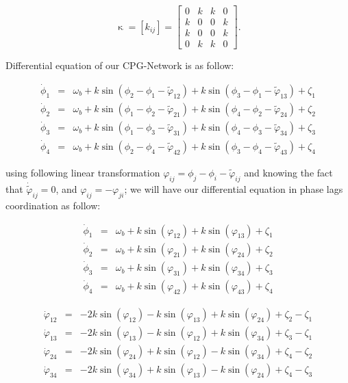 \documentclass{article}
\begin{document}
 	\[ \upkappa = [k_{ij}]=\left[ \begin{array}{rrrr}
	0 & k & k & 0  \\
	k & 0 & 0 & k  \\
	k & 0 & 0 & k  \\
	0 & k & k & 0 
	\end{array} \right].\]

Differential equation of our CPG-Network is as follow:

\begin{eqnarray}\label{eq:cpg_net}
	\dot\phi_1&=&\omega_{b} + k\sin \left(\phi_2-\phi_1-\tilde{\varphi}_{12}\right)+k\sin\left(\phi_3-\phi_1-\tilde{\varphi}_{13}\right)+ \zeta_1\\
 	\dot\phi_2&=&\omega_{b} + k\sin \left(\phi_1-\phi_2-\tilde{\varphi}_{21}\right)+k\sin\left(\phi_4-\phi_2-\tilde{\varphi}_{24}\right)+ \zeta_2\\
 	\dot\phi_3&=&\omega_{b} + k\sin \left(\phi_1-\phi_3-\tilde{\varphi}_{31}\right)+k\sin\left(\phi_4-\phi_3-\tilde{\varphi}_{34}\right)+ \zeta_3\\
	\dot\phi_4&=&\omega_{b} + k\sin \left(\phi_2-\phi_4-\tilde{\varphi}_{42}\right)+k\sin\left(\phi_3-\phi_4-\tilde{\varphi}_{43}\right)+ \zeta_4
\end{eqnarray}

using following linear transformation $\varphi_{ij} = \phi_j - \phi_i - \tilde{\varphi}_{ij} $ and knowing the fact that $\dot{\tilde{\varphi}}_{ij} = 0$, and $\varphi_{ij} = - \varphi_{ji}$;  we will have our differential equation in phase lags coordination as follow:

\begin{eqnarray}\label{eq:cpg_net2}
	\dot\phi_1&=&\omega_{b} + k\sin \left(\varphi_{12}\right)+k\sin\left(\varphi_{13}\right)+ \zeta_1\\
 	\dot\phi_2&=&\omega_{b} + k\sin \left(\varphi_{21}\right)+k\sin\left(\varphi_{24}\right)+ \zeta_2\\
 	\dot\phi_3&=&\omega_{b} + k\sin \left(\varphi_{31}\right)+k\sin\left(\varphi_{34}\right)+ \zeta_3\\
	\dot\phi_4&=&\omega_{b} + k\sin \left(\varphi_{42}\right)+k\sin\left(\varphi_{43}\right)+ \zeta_4
\end{eqnarray}

\begin{eqnarray}\label{eq:cpg_net3}
	\dot\varphi_{12}&=& -2k\sin \left(\varphi_{12}\right)-k\sin\left(\varphi_{13}\right)+ k\sin\left(\varphi_{24}\right) + \zeta_2-\zeta_1\\
	\dot\varphi_{13}&=& -2k\sin \left(\varphi_{13}\right)-k\sin\left(\varphi_{12}\right)+ k\sin\left(\varphi_{34}\right) + \zeta_3-\zeta_1\\
	\dot\varphi_{24}&=& -2k\sin \left(\varphi_{24}\right)+k\sin\left(\varphi_{12}\right)- k\sin\left(\varphi_{34}\right) + \zeta_4-\zeta_2\\
	\dot\varphi_{34}&=& -2k\sin \left(\varphi_{34}\right)+k\sin\left(\varphi_{13}\right)- k\sin\left(\varphi_{24}\right) + \zeta_4-\zeta_3\\
\end{eqnarray}
\end{document}
